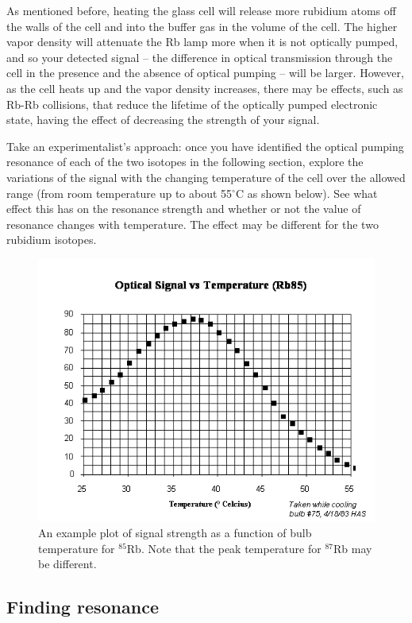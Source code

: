\documentclass[11pt]{article}
\begin{document}
As mentioned before, heating the glass cell will release more rubidium atoms off the walls of the cell and into the buffer gas in the volume of the cell. The higher vapor density will attenuate the Rb lamp more when it is not optically pumped, and so your detected signal -- the difference in optical transmission through the cell in the presence and the absence of optical pumping -- will be larger. However, as the cell heats up and the vapor density increases, there may be effects, such as Rb-Rb collisions, that reduce the lifetime of the optically pumped electronic state, having the effect of decreasing the strength of your signal.

Take an experimentalist's approach: once you have identified the optical pumping resonance of each of the two isotopes in the following section, explore the variations of the signal with the changing temperature of the cell over the allowed range (from room temperature up to about 55$^\circ$C as shown below). See what effect this has on the resonance strength and whether or not the value of resonance changes with temperature. The effect may be different for the two rubidium isotopes. 

\begin{figure}
\centering
\includegraphics[width=\textwidth]{figures/OPTimage006.png}
\caption{An example plot of signal strength as a function of bulb temperature for $^85$Rb. Note that the peak temperature for $^87$Rb may be different.}
\label{fig:tempdep}
\end{figure}

\subsection{Finding resonance}
\end{document}
